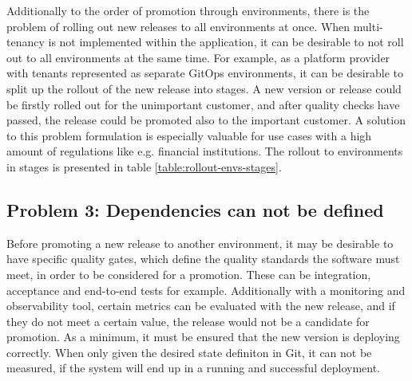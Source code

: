 Additionally to the order of promotion through environments,
there is the problem of rolling out new releases to all environments at once.
When
multi-tenancy is not implemented within the application,
it can be desirable to not roll out to all environments at the same time.
For example, as a platform provider with tenants represented as separate GitOps
environments, it can be desirable to split up the rollout of the new release into stages.
A new version or release could be firstly rolled out for the unimportant customer,
and after quality checks have passed,
the release could be promoted also to the important customer.
A solution to this problem formulation is especially valuable for
use cases with a high amount of regulations like e.g. financial institutions.
The rollout to environments in stages is presented in table \ref{table:rollout-envs-stages}.





\subsection{Problem 3: Dependencies can not be defined}
\label{problem3}

Before promoting a new release to another environment,
it may be desirable to have specific
quality gates, which define the quality standards the
software must meet, in order to be considered for a promotion.
These can be integration, acceptance and end-to-end tests for example.
Additionally with a monitoring and observability tool,
certain metrics can be evaluated with the new release,
and if they do not meet a certain value, the release would not
be a candidate for promotion.
As a minimum, it must be ensured that the new version is 
deploying correctly. When only given the desired state definiton
in Git, it can not be measured, if the system will end up in a running
and successful deployment.

